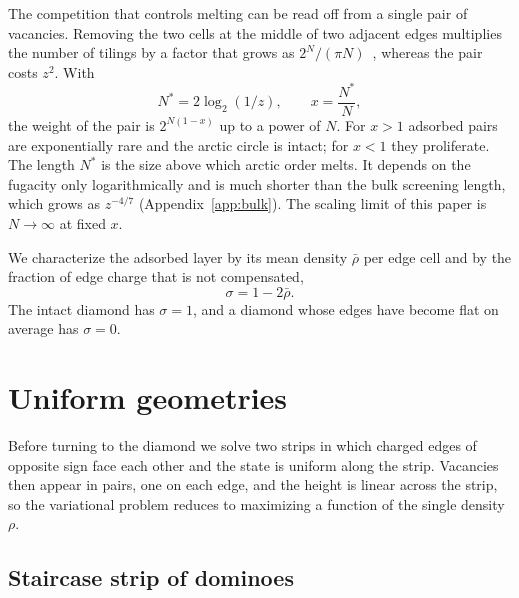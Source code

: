 \documentclass[reprint,aps,pre,superscriptaddress,longbibliography,floatfix,amsmath,amssymb]{revtex4-2}
\newcommand{\Nst}{N^{*}}                 %
\newcommand{\sig}{\sigma}                %
\begin{document}
The competition that controls melting can be read off from a single pair of vacancies. Removing the two cells at the middle of two adjacent edges multiplies the number of tilings by a factor that grows as $2^N/(\pi N)$~\cite{ciucu2023}, whereas the pair costs $z^2$. With
\begin{equation}\label{eq:x}
  \Nst=2\log_2(1/z),\qquad x=\frac{\Nst}{N},
\end{equation}
the weight of the pair is $2^{N(1-x)}$ up to a power of $N$. For $x>1$ adsorbed pairs are exponentially rare and the arctic circle is intact; for $x<1$ they proliferate. The length $\Nst$ is the size above which arctic order melts. It depends on the fugacity only logarithmically and is much shorter than the bulk screening length, which grows as $z^{-4/7}$ (Appendix~\ref{app:bulk}). The scaling limit of this paper is $N\to\infty$ at fixed $x$.

We characterize the adsorbed layer by its mean density $\bar\rho$ per edge cell and by the fraction of edge charge that is not compensated,
\begin{equation}\label{eq:sigma}
  \sig=1-2\bar\rho .
\end{equation}
The intact diamond has $\sig=1$, and a diamond whose edges have become flat on average has $\sig=0$.

\section{Uniform geometries}\label{sec:uniform}

Before turning to the diamond we solve two strips in which charged edges of opposite sign face each other and the state is uniform along the strip. Vacancies then appear in pairs, one on each edge, and the height is linear across the strip, so the variational problem reduces to maximizing a function of the single density $\rho$.

\subsection{Staircase strip of dominoes}
\end{document}
